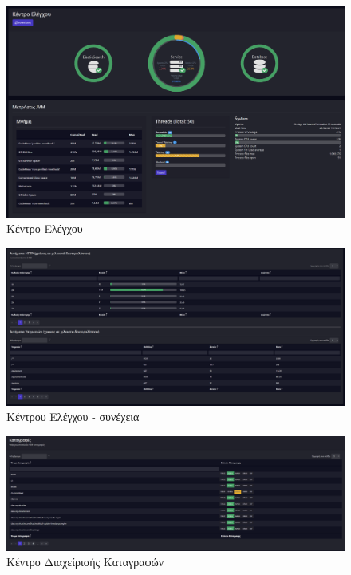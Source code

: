 \begin{figure}[H]
  \centering
  \includegraphics[width=145mm]{Chapters/5 - Architecture/Client/Images/admin_control_center.png}
  \caption{Κέντρο Ελέγχου}
  \label{layout:admin_cc_1}
\end{figure}
\begin{figure}[H]
  \centering
  \includegraphics[width=145mm]{Chapters/5 - Architecture/Client/Images/admin_control_center_2.png}
  \caption{Κέντρου Ελέγχου - συνέχεια}
  \label{layout:admin_cc_2}
\end{figure}
\begin{figure}[H]
  \centering
  \includegraphics[width=145mm]{Chapters/5 - Architecture/Client/Images/admin_l.png}
  \caption{Κέντρο Διαχείρισής Καταγραφών}
  \label{layout:admin_l}
\end{figure}
